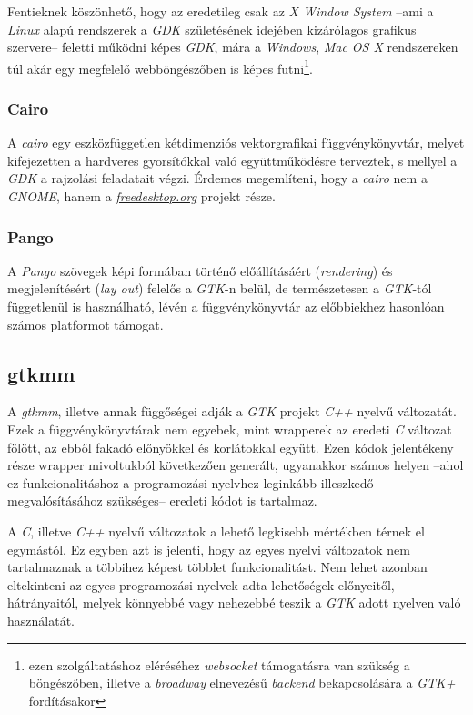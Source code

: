 Fentieknek köszönhető, hogy az eredetileg csak az \textit{X Window System} --ami a \textit{Linux} alapú rendszerek a \textit{GDK} születésének idejében kizárólagos grafikus szervere-- feletti működni képes \textit{GDK}, mára a \textit{Windows}, \textit{Mac OS X} rendszereken túl akár egy megfelelő webböngészőben is képes futni\footnote{ezen szolgáltatáshoz eléréséhez \textit{websocket} támogatásra van szükség a böngészőben, illetve a \textit{broadway} elnevezésű \textit{backend} bekapcsolására a \textit{GTK+} fordításakor}.

\subsubsection{Cairo}

A \textit{cairo} egy eszközfüggetlen kétdimenziós vektorgrafikai függvénykönyvtár, melyet kifejezetten a hardveres gyorsítókkal való együttműködésre terveztek, s mellyel a \textit{GDK} a rajzolási feladatait végzi. Érdemes megemlíteni, hogy a \textit{cairo} nem a \textit{GNOME}, hanem a \href{http://freedesktop.org}{\textit{freedesktop.org}} projekt része.

\subsubsection{Pango}

A \textit{Pango} szövegek képi formában történő előállításáért (\textit{rendering}) és megjelenítésért (\textit{lay out}) felelős a \textit{GTK}-n belül, de természetesen a \textit{GTK}-tól függetlenül is használható, lévén a függvénykönyvtár az előbbiekhez hasonlóan számos platformot támogat.


\subsection{gtkmm}

A \textit{gtkmm}, illetve annak függőségei adják a \textit{GTK} projekt \textit{C++} nyelvű változatát. Ezek a függvénykönyvtárak nem egyebek, mint wrapperek az eredeti \textit{C} változat fölött, az ebből fakadó előnyökkel és korlátokkal együtt. Ezen kódok jelentékeny része wrapper mivoltukból következően generált, ugyanakkor számos helyen --ahol ez funkcionalitáshoz a programozási nyelvhez leginkább illeszkedő megvalósításához szükséges-- eredeti kódot is tartalmaz.

A \textit{C}, illetve \textit{C++} nyelvű változatok a lehető legkisebb mértékben térnek el egymástól. Ez egyben azt is jelenti, hogy az egyes nyelvi változatok nem tartalmaznak a többihez képest többlet funkcionalitást. Nem lehet azonban eltekinteni az egyes programozási nyelvek adta lehetőségek előnyeitől, hátrányaitól, melyek könnyebbé vagy nehezebbé teszik a \textit{GTK} adott nyelven való használatát.

